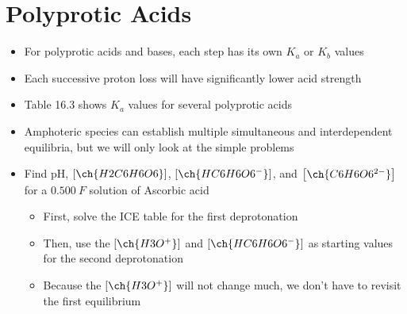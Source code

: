 \documentclass[12pt, openany, letterpaper]{memoir}
\begin{document}
\section{Polyprotic Acids}
\begin{itemize}
	\item For polyprotic acids and bases, each step has its own $K_a$ or $K_b$ values
	\item Each successive proton loss will have significantly lower acid strength
	\item Table 16.3 shows $K_a$ values for several polyprotic acids
	\item Amphoteric species can establish multiple simultaneous and interdependent equilibria, but we will only look at the simple problems
	\item Find pH, $\left[\ch{H2C6H6O6}\right]$, $\left[\ch{HC6H6O6^-}\right]$, and  $\left[\ch{C6H6O6^{2-}}\right]$ for a $0.500~F$ solution of Ascorbic acid
	\begin{itemize}
		\item First, solve the ICE table for the first deprotonation
		\item Then, use the $\left[\ch{H3O^+}\right]$ and $\left[\ch{HC6H6O6^-}\right]$ as starting values for the second deprotonation
		\item Because the $\left[\ch{H3O^+}\right]$ will not change much, we don't have to revisit the first equilibrium
	\end{itemize}
\end{itemize}
\end{document}
